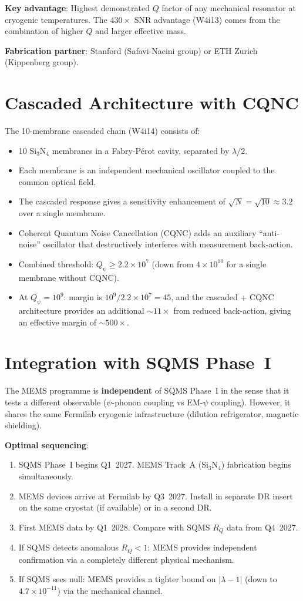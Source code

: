 \documentclass[11pt]{article}
\newcommand{\ee}[1]{\times 10^{#1}}
\newcommand{\lbone}{|\lambda - 1|}
\newcommand{\Qpsi}{Q_\psi}
\begin{document}
\textbf{Key advantage}: Highest demonstrated $Q$ factor of any
mechanical resonator at cryogenic temperatures. The $430\times$ SNR
advantage (W4i13) comes from the combination of higher $Q$ and larger
effective mass.

\textbf{Fabrication partner}: Stanford (Safavi-Naeini group) or ETH
Zurich (Kippenberg group).


\section{Cascaded Architecture with CQNC}

The 10-membrane cascaded chain (W4i14) consists of:
\begin{itemize}[nosep]
\item 10 Si$_3$N$_4$ membranes in a Fabry-P\'erot cavity, separated
  by $\lambda/2$.
\item Each membrane is an independent mechanical oscillator coupled
  to the common optical field.
\item The cascaded response gives a sensitivity enhancement of
  $\sqrt{N} = \sqrt{10} \approx 3.2$ over a single membrane.
\item Coherent Quantum Noise Cancellation (CQNC) adds an auxiliary
  ``anti-noise'' oscillator that destructively interferes with
  measurement back-action.
\item Combined threshold: $\Qpsi \geq 2.2\ee{7}$ (down from
  $4\ee{10}$ for a single membrane without CQNC).
\item At $\Qpsi = 10^9$: margin is $10^9 / 2.2\ee{7} = 45$, and the
  cascaded + CQNC architecture provides an additional $\sim 11\times$
  from reduced back-action, giving an effective margin of $\sim 500\times$.
\end{itemize}


\section{Integration with SQMS Phase~I}

The MEMS programme is \textbf{independent} of SQMS Phase~I in the
sense that it tests a different observable ($\psi$-phonon coupling
vs EM-$\psi$ coupling). However, it shares the same Fermilab
cryogenic infrastructure (dilution refrigerator, magnetic shielding).

\textbf{Optimal sequencing}:
\begin{enumerate}[nosep]
\item SQMS Phase~I begins Q1~2027. MEMS Track~A (Si$_3$N$_4$)
  fabrication begins simultaneously.
\item MEMS devices arrive at Fermilab by Q3~2027. Install in separate
  DR insert on the same cryostat (if available) or in a second DR.
\item First MEMS data by Q1~2028. Compare with SQMS $R_Q$ data from
  Q4~2027.
\item If SQMS detects anomalous $R_Q < 1$: MEMS provides independent
  confirmation via a completely different physical mechanism.
\item If SQMS sees null: MEMS provides a tighter bound on $\lbone$
  (down to $4.7\ee{-11}$) via the mechanical channel.
\end{enumerate}
\end{document}
